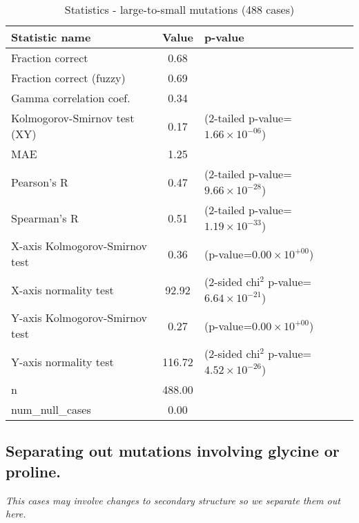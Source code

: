 \documentclass[10pt, letterpaper, oneside, titlepage, landscape]{scrreprt}
\begin{document}
\begin{table}[H]\begin{center}
\begin{tabular}{ l S[table-format=3.2] l}
Statistic name & {Value} & p-value\\
\hline
Fraction correct & 0.68 & \\
Fraction correct (fuzzy) & 0.69 & \\
Gamma correlation coef. & 0.34 & \\
Kolmogorov-Smirnov test (XY) & 0.17 & (2-tailed p-value=$1.66\times10^{-06}$)\\
MAE & 1.25 & \\
Pearson's R & 0.47 & (2-tailed p-value=$9.66\times10^{-28}$)\\
Spearman's R & 0.51 & (2-tailed p-value=$1.19\times10^{-33}$)\\
X-axis Kolmogorov-Smirnov test & 0.36 & (p-value=$0.00\times10^{+00}$)\\
X-axis normality test & 92.92 & (2-sided chi$^{2}$ p-value=$6.64\times10^{-21}$)\\
Y-axis Kolmogorov-Smirnov test & 0.27 & (p-value=$0.00\times10^{+00}$)\\
Y-axis normality test & 116.72 & (2-sided chi$^{2}$ p-value=$4.52\times10^{-26}$)\\
n & 488.00 & \\
num\_null\_cases & 0.00 & \\
\end{tabular}
\caption{Statistics - large-to-small mutations (488 cases)}
\end{center}\end{table}


\subsection{Separating out mutations involving glycine or proline.}
\textit{This cases may involve changes to secondary structure so we separate them out here.}
\end{document}
